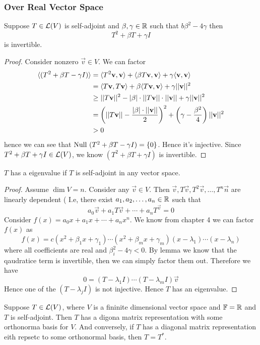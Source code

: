 \subsubsection{Over Real Vector Space}
\begin{lemma}
	Suppose $T \in \mathcal L(V)$ is self-adjoint and $\beta, \gamma \in \mathbb R$ such that $b\beta^2 - 4 \gamma$ then
	\[ T^2 + \beta T + \gamma I\] is invertible.
\end{lemma}
\begin{proof}
Consider nonzero $\vec v \in V$. We can factor 
	\begin{align*}
		\langle (T^2 + \beta T - \gamma I) \rangle &= \langle T^2 \mathbf v, \mathbf v \rangle + \langle \beta T \mathbf v, \mathbf v \rangle + \gamma \langle \mathbf v, \mathbf v\rangle \\
		&= \langle T\mathbf v, T\mathbf v \rangle + \beta \langle T\mathbf v, \mathbf v\rangle + \gamma||\mathbf v||^2 \\
		&\geq ||T\mathbf v||^2 - |\beta| \cdot ||T\mathbf v|| \cdot ||\mathbf v|| + \gamma||\mathbf v||^2  \\
		&= \left( ||T\mathbf v|| - \frac{|\beta| \cdot ||\mathbf v||}{2} \right)^2 + \left( \gamma - \frac{\beta^2}{4} \right)||\mathbf v||^2 \\
		&> 0
	\end{align*}
	hence we can see that $\text{Null } (T^2 + \beta T - \gamma I) = \left\{ 0 \right\}$. Hence it's injective. Since $T^2 + \beta T + \gamma I \in \mathcal L(V)$, we know $(T^2 + \beta T + \gamma I)$ is invertible. 
\end{proof}
\begin{theorem}
	$T$ has a eigenvalue if $T$ is self-adjoint in any vector space.
\end{theorem}
\begin{proof}
	Assume $\dim V = n$. Consider any $\vec v \in V$. Then $\vec v, T\vec v, T^2 \vec v, \ldots, T^n \vec n$ are linearly dependent ( I.e, there exist ${a}_1,{a}_2, \ldots, {a}_{n} \in \mathbb R$ such that 
	\[a_0 \vec v + a_1 T \vec v + \cdots + a_n T^\vec v = 0\]
	Consider $f(x) = a_0x + a_1x + \cdots + a_nx^n$. We know from chapter 4 we can factor $f(x)$ as 
	\[ f(x) = c(x^2 + \beta_1 x + \gamma_1) \cdots (x^2 + \beta_m x + \gamma_m) (x - \lambda_1) \cdots (x - \lambda_n)\]
	where all coefficients are real and $\beta_i^2 - 4 \gamma < 0$. By lemma we know that the qaudratice term is invertible, then we can simply factor them out. Therefore we have 
	\[ 0 = (T - \lambda_1 I) \cdots (T - \lambda_m I)\vec v\]
	Hence one of the $(T - \lambda_j I)$ is not injective. Hence $T$ has an eigenvalue.
\end{proof}
\begin{theorem}
	Suppose $T \in \mathcal L(V)$, where $V$ is a fininite dimensional vector space and $\mathbb F = \mathbb R$ and $T$ is self-adjoint. Then $T$ has a digona matrix representation with some orthonorma basis for $V$. And conversely, if $T$ has a diagonal matrix representation eith repsetc to some orthonormal basis, then $T = T^*$.
\end{theorem}
